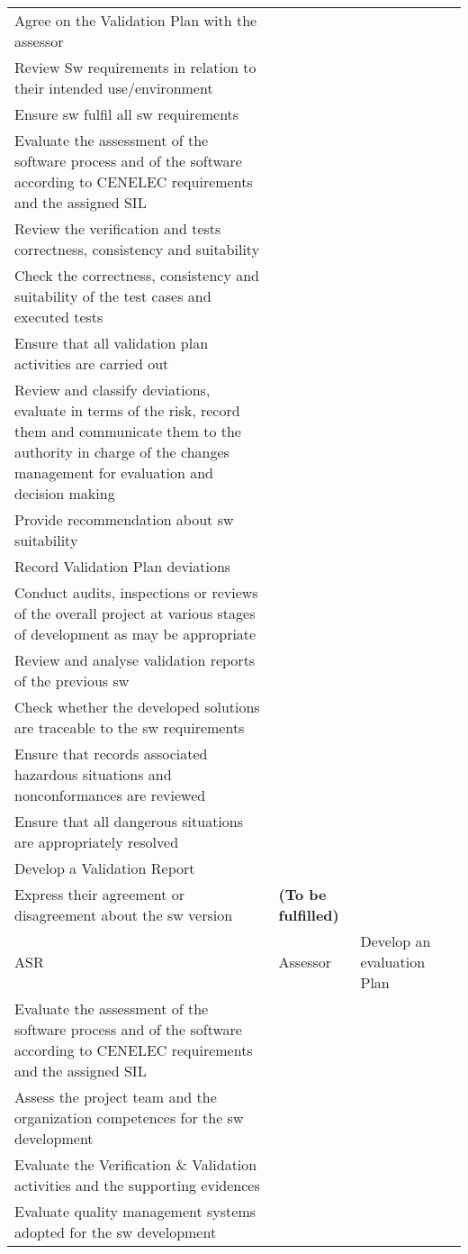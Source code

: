 \documentclass{template/openetcs_article}
\begin{document}
\begin{landscape}
\begin{appendices}
\begin{center}
\begin{longtable}{|m{1cm}|m{}|m{11cm}|m{10cm}|}
Agree on the Validation Plan with the \gls{assessor}\\
Review Sw requirements in relation to their intended use/environment\\
Ensure sw fulfil all sw requirements\\
Evaluate the assessment of the software process and of the software according to CENELEC requirements and the assigned \gls{SIL}\\
Review the verification and tests correctness, consistency and suitability \\
Check the correctness, consistency and suitability of the test cases and executed tests\\
Ensure that all validation plan activities are carried out\\
Review and classify deviations, evaluate in terms of the risk, record them and communicate them to the authority in charge of the changes management for evaluation and decision making\\ 
Provide recommendation about sw suitability\\
Record Validation Plan deviations\\
Conduct audits, inspections or reviews of the overall project at various stages of development as may be appropriate\\
Review and analyse validation reports of the previous sw\\
Check whether the developed solutions are traceable to the sw requirements \\
Ensure that records associated hazardous situations and nonconformances are reviewed\\
Ensure that all dangerous situations are appropriately resolved\\
Develop a Validation Report\\
Express their agreement or disagreement about the sw version  &
\textbf{(To be fulfilled)}
\\\hline
\gls{ASR} &
Assessor &
\raggedright
Develop an evaluation Plan\\
Evaluate the assessment of the software process and of the software according to CENELEC requirements and the assigned \gls{SIL}\\
Assess the project team and the organization competences for the sw development\\
Evaluate the Verification \& Validation activities and the supporting evidences\\
Evaluate quality management systems adopted for  the sw development\\

\end{longtable}
\end{center}
\end{appendices}
\end{landscape}
\end{document}
